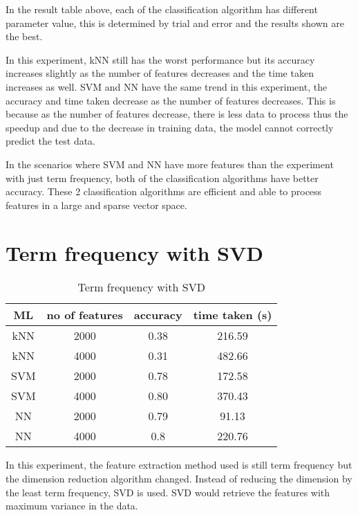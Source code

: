 In the result table above, each of the classification algorithm has different parameter value, this is determined by trial and error and the results shown are the best.

In this experiment, kNN still has the worst performance but its accuracy increases slightly as the number of features decreases and the time taken increases as well. SVM and NN have the same trend in this experiment, the accuracy and time taken decrease as the number of features decreases. This is because as the number of features decrease, there is less data to process thus the speedup and due to the decrease in training data, the model cannot correctly predict the test data.

In the scenarios where SVM and NN have more features than the experiment with just term frequency, both of the classification algorithms have better accuracy. These 2 classification algorithms are efficient and able to process features in a large and sparse vector space.



\section{Term frequency with SVD}

\begin{table} [ht]
	\centering
	\begin{tabular}{|| c | c | c | c||}
		\hline
		ML & no of features & accuracy & time taken (s) \\ [0.5ex]
		\hline\hline
		kNN & 2000 & 0.38 & 216.59 \\ 
		\hline
		kNN & 4000 & 0.31 & 482.66 \\
		\hline\hline
		SVM & 2000 & 0.78 & 172.58 \\
		\hline
		SVM & 4000 & 0.80 & 370.43 \\
		\hline\hline
		NN & 2000 & 0.79 & 91.13 \\
		\hline
		NN & 4000 & 0.8 & 220.76 \\
		\hline\hline
	\end{tabular}
\caption{Term frequency with SVD}
\label{tbl:termFrequencySvd}
\end{table}

In this experiment, the feature extraction method used is still term frequency but the dimension reduction algorithm changed. Instead of reducing the dimension by the least term frequency, SVD is used. SVD would retrieve the features with maximum variance in the data.

